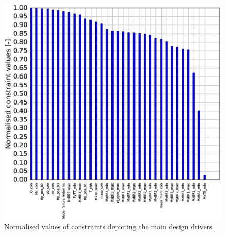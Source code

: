 \begin{figure}[!ht]
\begin{center}
	\includegraphics[width=.85\linewidth]{figures/KB6_final/KB6_cons_list.eps}
\end{center}
\caption{Normalised values of constraints depicting the main design drivers.}
\label{fig:KB6_cons}
\end{figure}





